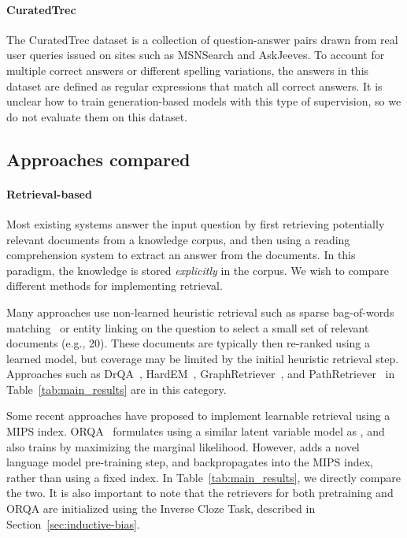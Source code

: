 \paragraph{CuratedTrec}
The CuratedTrec dataset is a collection of question-answer pairs drawn from real user queries issued on sites such as MSNSearch and AskJeeves. To account for multiple correct answers or different spelling variations, the answers in this dataset are defined as regular expressions that match all correct answers. It is unclear how to train generation-based models with this type of supervision, so we do not evaluate them on this dataset.

\subsection{Approaches compared}
\label{sec:comparisons}
%
%
\paragraph{Retrieval-based \openqa}
Most existing \openqa systems answer the input question by first retrieving potentially relevant documents from a knowledge corpus, and then using a reading comprehension system to extract an answer from the documents. In this paradigm, the knowledge is stored \emph{explicitly} in the corpus.
We wish to compare different methods for implementing retrieval.

Many approaches use non-learned heuristic retrieval such as sparse bag-of-words matching~\cite{bm25} or entity linking on the question to select a small set of relevant documents (e.g., 20). These documents are typically then re-ranked using a learned model, but coverage may be limited by the initial heuristic retrieval step. Approaches such as DrQA~\cite{drqa}, HardEM~\cite{openqa_hardem}, GraphRetriever~\cite{GraphRetriever}, and PathRetriever~\cite{rrp_salesforce} in Table~\ref{tab:main_results} are in this category.

Some recent approaches have proposed to implement learnable retrieval using a MIPS index. ORQA~\cite{orqa} formulates \openqa using a similar latent variable model as \thename, and also trains by maximizing the marginal likelihood. However, \thename adds a novel language model pre-training step, and backpropagates into the MIPS index, rather than using a fixed index. In Table~\ref{tab:main_results}, we directly compare the two. It is also important to note that the retrievers for both \thename pretraining and ORQA are initialized using the Inverse Cloze Task, described in Section~\ref{sec:inductive-bias}.

